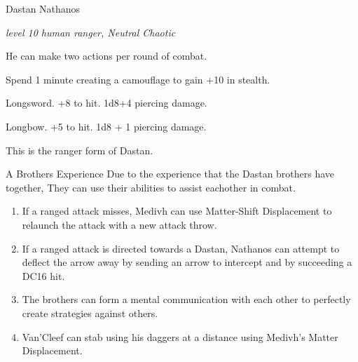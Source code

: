 \begin{monsterbox}{Dastan Nathanos}
	\begin{hangingpar}
		\textit{level 10 human ranger, Neutral Chaotic}
	\end{hangingpar}
	\dndline%
	\basics[%
	armorclass = 16,
	hitpoints  = 85,
	speed      = 40 ft
	]
	\dndline%
	\stats[
	STR = \stat{18}, %
	DEX = \stat{13},
	CON = \stat{12},
	INT = \stat{11},
	WIS = \stat{14},
	CHA = \stat{12}
	]
	\dndline%
	\details[%
	languages = {Common, Elvish, Dwarvish, Gnomish, Halfling, Celestial, Draconic, Primordial},
	challenge = 10
	]
	\dndline%
	\begin{monsteraction}
		He can make two actions per round of combat.
	\end{monsteraction}	
	\begin{monsteraction}
		Spend 1 minute creating a camouflage to gain +10 in stealth.
	\end{monsteraction}	
	\begin{monsteraction}[Melee]
		Longsword. +8 to hit. 1d8+4 piercing damage. 
	\end{monsteraction}
	\begin{monsteraction}[Ranged]
		Longbow. +5 to hit. 1d8 + 1 piercing damage.
	\end{monsteraction}
	This is the ranger form of Dastan.
\end{monsterbox}

\begin{commentbox}{A Brothers Experience}
	Due to the experience that the Dastan brothers have together, They can use their abilities to assist eachother in combat.
	\begin{enumerate}
		\item  If a ranged attack misses, Medivh can use Matter-Shift Displacement to relaunch the attack with a new attack throw.
		\item If a ranged attack is directed towards a Dastan, Nathanos can attempt to deflect the arrow away by sending an arrow to intercept and by succeeding a DC16 hit.
		\item The brothers can form a mental communication with each other to perfectly create strategies against others.
		\item Van'Cleef can stab using his daggers at a distance using Medivh's Matter Displacement.
	\end{enumerate}
\end{commentbox}



